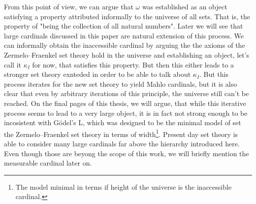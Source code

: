 From this point of view, we can argue that $\omega$ was established as an object satisfying a property attributed informally to the universe of all sets. That is, the property of "being the collection of all natural numbers". Later we will see that large cardinals discussed in this paper are natural extension of this process. We can informally obtain the inaccessible cardinal by arguing the the axioms of the Zermelo–Fraenkel set theory hold in the universe and establishing an object, let's call it $\kappa_I$ for now, that satisfies this property. But then this either leads to a stronger set theory exnteded in order to be able to talk about $\kappa_I$. But this process iterates for the new set theory to yield Mahlo cardinals, but it is also clear that even by arbitrary iterations of this principle, the universe still can't be reached. On the final pages of this thesis, we will argue, that while this iterative process seems to lead to a very large object, it is in fact not strong enough to be incosistent with Gödel's L, which was designed to be the minimal model of set the Zermelo–Fraenkel set theory in terms of width\footnote{The model minimal in terms if height of the universe is the inaccessible cardinal.}. Present day set theory is able to consider many large cardinals far above the hierarchy introduced here. Even though those are beyong the scope of this work, we will briefly mention the measurable cardinal later on.